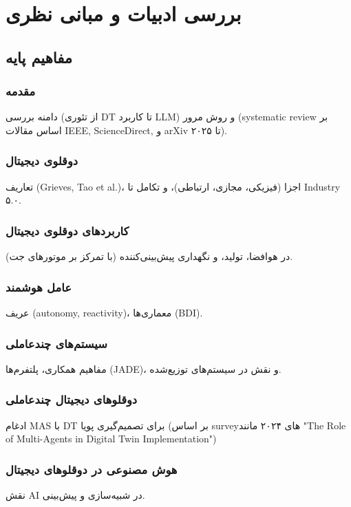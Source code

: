 \chapter{بررسی ادبیات و مبانی نظری}\label{chap:review}

\section{مفاهیم پایه}\label{chap:brain}

\subsection{مقدمه}
دامنه بررسی (از تئوری DT تا کاربرد LLM) و روش مرور (systematic review بر اساس مقالات IEEE, ScienceDirect, و arXiv تا ۲۰۲۵).

\subsection{دوقلوی دیجیتال}
تعاریف (Grieves, Tao et al.)، اجزا (فیزیکی، مجازی، ارتباطی)، و تکامل تا Industry ۵.۰.



\subsection{کاربردهای دوقلوی دیجیتال}
در هوافضا، تولید، و نگهداری پیش‌بینی‌کننده (با تمرکز بر موتورهای جت).

\subsection{عامل هوشمند}
عریف (autonomy, reactivity)، معماری‌ها (BDI).

\subsection{سیستم‌های چندعاملی}
مفاهیم همکاری، پلتفرم‌ها (JADE)، و نقش در سیستم‌های توزیع‌شده.

\subsection{دوقلوهای دیجیتال چندعاملی}
ادغام MAS با DT برای تصمیم‌گیری پویا (بر اساس surveyهای ۲۰۲۴ مانند "The Role of Multi-Agents in Digital Twin Implementation")

\subsection{هوش مصنوعی در دوقلوهای دیجیتال}
نقش AI در شبیه‌سازی و پیش‌بینی.

